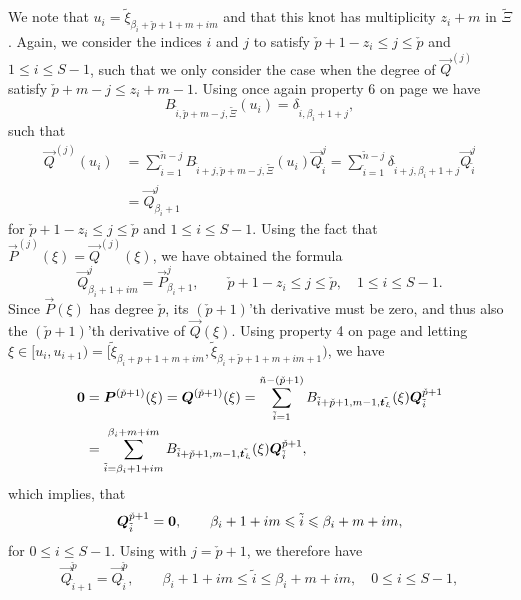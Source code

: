 We note that $u_i = \tilde{\xi}_{\beta_i+\check{p}+1+m+im}$ and that this knot has multiplicity $z_i+m$ in $\tilde{\Xi}$. Again, we consider the indices $i$ and $j$ to satisfy $\check{p}+1-z_i\leq j\leq \check{p}$ and $1\leq i\leq S-1$, such that we only consider the case when the degree of $\vec{Q}^{(j)}$ satisfy $\check{p}+m-j\leq z_i+m-1$. Using once again property 6 on page \pageref{List:properties} we have
\begin{equation*}
	B_{\tilde{i},\check{p}+m-j,\tilde{\Xi}}(u_i) = \delta_{\tilde{i},\beta_i+1+j},
\end{equation*}
such that
\begin{align*}
	\vec{Q}^{(j)}(u_i) &= \sum_{\tilde{i}=1}^{\tilde{n}-j} B_{\tilde{i}+j,\check{p}+m-j,\tilde{\Xi}}(u_i) \vec{Q}_{\tilde{i}}^j = \sum_{\tilde{i}=1}^{\tilde{n}-j} \delta_{\tilde{i}+j,\beta_i+1+j} \vec{Q}_{\tilde{i}}^j\\
	&= \vec{Q}_{\beta_i+1}^j
\end{align*}
for $\check{p}+1-z_i\leq j\leq \check{p}$ and $1\leq i\leq S-1$. Using the fact that $\vec{P}^{(j)}(\xi)=\vec{Q}^{(j)}(\xi)$, we have obtained the formula
\begin{equation}\label{Eq:coeffFormula4}
	\vec{Q}_{\beta_i+1+im}^j = \vec{P}_{\beta_i+1}^j,\qquad \check{p}+1-z_i\leq j\leq \check{p},\quad 1\leq i\leq S-1.
\end{equation}
Since $\vec{P}(\xi)$ has degree $\check{p}$, its $(\check{p}+1)$'th derivative must be zero, and thus also the $(\check{p}+1)$'th derivative of $\vec{Q}(\xi)$. Using property 4 on page \pageref{List:properties} and letting $\xi\in [u_i,u_{i+1})=[\tilde{\xi}_{\beta_i+p+1+m+i m},\tilde{\xi}_{\beta_i+\check{p}+1+m+i m+1})$, we have
\begin{align*}
	\zerovec &=\vec{P}^{(\check{p}+1)}(\xi) = \vec{Q}^{(\check{p}+1)}(\xi) = \sum_{\tilde{i}=1}^{\tilde{n}-(\check{p}+1)} B_{\tilde{i}+\check{p}+1,m-1,\tilde{\Xi}}(\xi) \vec{Q}_{\tilde{i}}^{\check{p}+1} \\
	&= \sum_{\tilde{i}=\beta_i+1+i m}^{\beta_i+m+i m} B_{\tilde{i}+\check{p}+1,m-1,\tilde{\Xi}}(\xi) \vec{Q}_{\tilde{i}}^{\check{p}+1},
\end{align*}
which implies, that
\begin{equation*}
	\vec{Q}_{\tilde{i}}^{\check{p}+1} = \zerovec,\qquad \beta_i+1+i m \leq \tilde{i} \leq \beta_i+m+i m,
\end{equation*}
for $0\leq i \leq S-1$. Using  with $j=\check{p}+1$, we therefore have 
\begin{equation*}
	\vec{Q}_{\tilde{i}+1}^{\check{p}} = \vec{Q}_{\tilde{i}}^{\check{p}},\qquad\beta_i+1+i m \leq \tilde{i} \leq \beta_i+m+i m,\quad 0\leq i \leq S-1,
\end{equation*}
